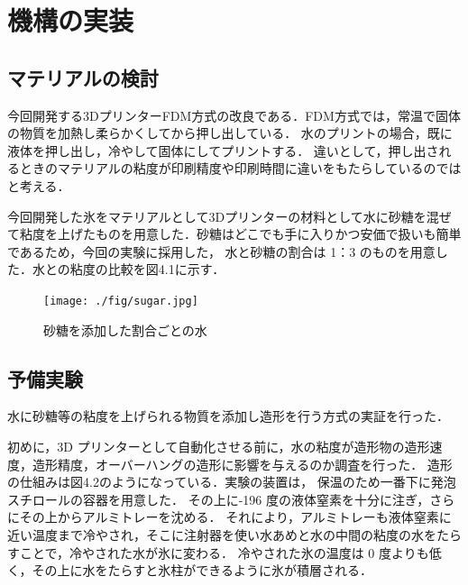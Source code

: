 \chapter{機構の実装}
\label{chp:first}

\section{マテリアルの検討}
\label{sec:paragraph}
今回開発する3DプリンターFDM方式の改良である．FDM方式では，常温で固体の物質を加熱し柔らかくしてから押し出している．
水のプリントの場合，既に液体を押し出し，冷やして固体にしてプリントする．
違いとして，押し出されるときのマテリアルの粘度が印刷精度や印刷時間に違いをもたらしているのではと考える．

今回開発した氷をマテリアルとして3Dプリンターの材料として水に砂糖を混ぜて粘度を上げたものを用意した．砂糖はどこでも手に入りかつ安価で扱いも簡単であるため，今回の実験に採用した，
水と砂糖の割合は 1：3 のものを用意した．水との粘度の比較を図4.1に示す．

\begin{figure}[H]
  \centering
  \texttt{[image: ./fig/sugar.jpg]}
  \caption{砂糖を添加した割合ごとの水}
  \label{fig:stage}
\end{figure}


\section{予備実験}
\label{sec:paragraph}

水に砂糖等の粘度を上げられる物質を添加し造形を行う方式の実証を行った．

初めに，3D プリンターとして自動化させる前に，水の粘度が造形物の造形速度，造形精度，オーバーハングの造形に影響を与えるのか調査を行った． 
造形の仕組みは図4.2のようになっている．実験の装置は， 保温のため一番下に発泡スチロールの容器を用意した．
その上に-196 度の液体窒素を十分に注ぎ，さらにその上からアルミトレーを沈める．
それにより，アルミトレーも液体窒素に近い温度まで冷やされ，そこに注射器を使い水あめと水の中間の粘度の水をたらすことで，冷やされた水が氷に変わる．
冷やされた氷の温度は 0 度よりも低く，その上に水をたらすと氷柱ができるように氷が積層される． 

